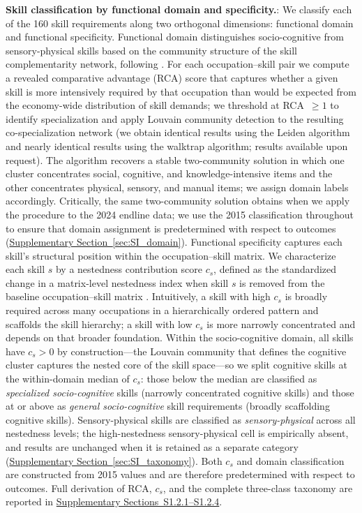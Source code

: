 \documentclass[11pt, letterpaper]{article} %
\newcommand{\parencite}[1]{\cite{#1}}
\newcommand{\textcite}[1]{\cite{#1}}
\begin{document}
\textbf{Skill classification by functional domain and specificity.}: We classify each of the 160 skill requirements along two orthogonal dimensions: functional domain and functional specificity. Functional domain distinguishes socio-cognitive from sensory-physical skills based on the community structure of the skill complementarity network, following \textcite{alabdulkareem_unpacking_2018}. For each occupation--skill pair we compute a revealed comparative advantage (RCA) score that captures whether a given skill is more intensively required by that occupation than would be expected from the economy-wide distribution of skill demands; we threshold at RCA~$\geq 1$ to identify specialization and apply Louvain community detection to the resulting co-specialization network (we obtain identical results using the Leiden algorithm and nearly identical results using the walktrap algorithm; results available upon request). The algorithm recovers a stable two-community solution in which one cluster concentrates social, cognitive, and knowledge-intensive items and the other concentrates physical, sensory, and manual items; we assign domain labels accordingly. Critically, the same two-community solution obtains when we apply the procedure to the 2024 endline data; we use the 2015 classification throughout to ensure that domain assignment is predetermined with respect to outcomes (\hyperref[sec:SI_domain]{Supplementary Section~\ref*{sec:SI_domain}}). Functional specificity captures each skill's structural position within the occupation--skill matrix. We characterize each skill $s$ by a nestedness contribution score $c_s$, defined as the standardized change in a matrix-level nestedness index when skill $s$ is removed from the baseline occupation--skill matrix \parencite{hosseinioun_skill_2025}. Intuitively, a skill with high $c_s$ is broadly required across many occupations in a hierarchically ordered pattern and scaffolds the skill hierarchy; a skill with low $c_s$ is more narrowly concentrated and depends on that broader foundation. Within the socio-cognitive domain, all skills have $c_s > 0$ by construction---the Louvain community that defines the cognitive cluster captures the nested core of the skill space---so we split cognitive skills at the within-domain median of $c_s$: those below the median are classified as \textit{specialized socio-cognitive} skills (narrowly concentrated cognitive skills) and those at or above as \textit{general socio-cognitive} skill requirements (broadly scaffolding cognitive skills). Sensory-physical skills are classified as \textit{sensory-physical} across all nestedness levels; the high-nestedness sensory-physical cell is empirically absent, and results are unchanged when it is retained as a separate category (\hyperref[sec:SI_taxonomy]{Supplementary Section~\ref*{sec:SI_taxonomy}}). Both $c_s$ and domain classification are constructed from 2015 values and are therefore predetermined with respect to outcomes. Full derivation of RCA, $c_s$, and the complete three-class taxonomy are reported in \hyperref[sec:SI_skill_class]{Supplementary Sections~S1.2.1--S1.2.4}.
 
\end{document}
